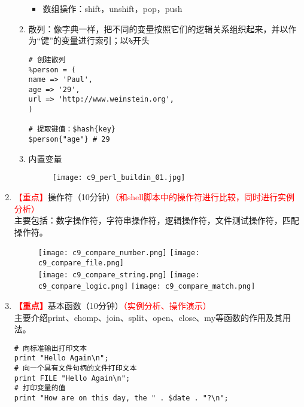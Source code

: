 \documentclass{TIJMUjiaoanLL}
\begin{document}
\begin{enumerate}
\begin{enumerate}
\begin{itemize}
	  \item 数组操作：shift，unshift，pop，push
	\end{itemize}


\otherTail
\newpage
\otherHeader


      \item 散列：像字典一样，把不同的变量按照它们的逻辑关系组织起来，并以作为“键”的变量进行索引；以\verb|%|开头
\begin{verbatim}
# 创建散列
%person = (
name => 'Paul',
age => '29',
url => 'http://www.weinstein.org',
)

# 提取键值：$hash{key}
$person{"age"} # 29
\end{verbatim}
      \item 内置变量
    \vspace*{-10pt}
    \begin{figure}[h]
      \centering
      \texttt{[image: c9\_perl\_buildin\_01.jpg]}
    \end{figure}
    \vspace*{-10pt}

    \end{enumerate}

  \item \textcolor{red}{【重点】}操作符（10分钟）\textcolor{red}{（和shell脚本中的操作符进行比较，同时进行实例分析）}
    \\ 主要包括：数字操作符，字符串操作符，逻辑操作符，文件测试操作符，匹配操作符。
    \vspace*{-10pt}
    \begin{figure}[h]
      \centering
      \texttt{[image: c9\_compare\_number.png]}
      \quad
      \texttt{[image: c9\_compare\_file.png]}\\
      \texttt{[image: c9\_compare\_string.png]}
      \quad
      \texttt{[image: c9\_compare\_logic.png]}
      \quad
      \texttt{[image: c9\_compare\_match.png]}
    \end{figure}
    \vspace*{-10pt}


\otherTail
\newpage
\otherHeader


\item \textcolor{red}{\textbf{【重点】}}基本函数（10分钟）\textcolor{red}{（实例分析、操作演示）}
  \\ 主要介绍print、chomp、join、split、open、close、my等函数的作用及其用法。
  \vspace*{-10pt}
\begin{verbatim}
# 向标准输出打印文本
print "Hello Again\n";
# 向一个具有文件句柄的文件打印文本
print FILE "Hello Again\n";
# 打印变量的值
print "How are on this day, the " . $date . "?\n";


\end{verbatim}
\end{enumerate}
\end{document}
